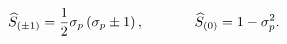 \begin{equation}
\widehat{S}_{(\pm 1)}=\frac 12\sigma _p\left( \sigma _p\pm
1\right) ,\hspace{0.5in}\widehat{S}_{(0)}=1-\sigma _p^2
.\label{70}
\end{equation}

